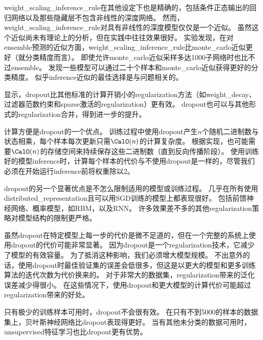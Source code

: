 
\gls{weight_scaling_inference_rule}在其他设定下也是精确的，包括条件正态输出的回归网络以及那些隐藏层不包含非线性的深度网络。
然而，\gls{weight_scaling_inference_rule}对具有非线性的深度模型仅仅是一个近似。
虽然这个近似尚未有理论上的分析，但在实践中往往效果很好。
\cite{Goodfellow-et-al-2013a}实验发现，在对\gls{ensemble}预测的近似方面，\gls{weight_scaling_inference_rule}比\gls{monte_carlo}近似更好（就分类精度而言）。
即使允许\gls{monte_carlo}近似采样多达1000子网络时也比不过\gls{ensemble}。
\cite{Gal-Ghahramani-2015}发现一些模型可以通过二十个样本和\gls{monte_carlo}近似获得更好的分类精度。
似乎\gls{inference}近似的最佳选择是与问题相关的。

\cite{Srivastava-et-al-2014}显示，\gls{dropout}比其他标准的计算开销小的\gls{regularization}方法（如\gls{weight_decay}、过滤器范数约束和\gls{sparse}激活的\gls{regularization}）更有效。
\gls{dropout}也可以与其他形式的\gls{regularization}合并，得到进一步的提升。

计算方便是\gls{dropout}的一个优点。
训练过程中使用\gls{dropout}产生$n$个随机二进制数与状态相乘，每个样本每次更新只需$\CalO(n)$的计算复杂度。
根据实现，也可能需要$\CalO(n)$的存储空间来持续保存这些二进制数（直到反向传播阶段）。
使用训练好的模型\gls{inference}时，计算每个样本的代价与不使用\gls{dropout}是一样的，尽管我们必须在开始运行\gls{inference}前将权重除以2。


\gls{dropout}的另一个显著优点是不怎么限制适用的模型或训练过程。
几乎在所有使用\gls{distributed_representation}且可以用\gls{SGD}训练的模型上都表现很好。
包括前馈神经网络、概率模型，如\gls{RBM}\citep{Srivastava-et-al-2014}，以及\gls{RNN}\citep{Bayer-Osendorfer-2014,Pascanu-et-al-2014a}。
许多效果差不多的其他\gls{regularization}策略对模型结构的限制更严格。

虽然\gls{dropout}在特定模型上每一步的代价是微不足道的，但在一个完整的系统上使用\gls{dropout}的代价可能非常显著。
因为\gls{dropout}是一个\gls{regularization}技术，它减少了模型的有效容量。
为了抵消这种影响，我们必须增大模型规模。
不出意外的话，使用\gls{dropout}时最佳验证集的误差会低很多，但这是以更大的模型和更多训练算法的迭代次数为代价换来的。
对于非常大的数据集，\gls{regularization}带来的泛化误差减少得很小。
在这些情况下，使用\gls{dropout}和更大模型的计算代价可能超过\gls{regularization}带来的好处。

只有极少的训练样本可用时，\gls{dropout}不会很有效。
在只有不到5000的样本的数据集上\citep{Neal-1996}，贝叶斯神经网络\citep{Xiong-et-al-2011}比\gls{dropout}表现得更好\citep{Srivastava-et-al-2014}。
当有其他未分类的数据可用时，\gls{unsupervised}特征学习也比\gls{dropout}更有优势。


